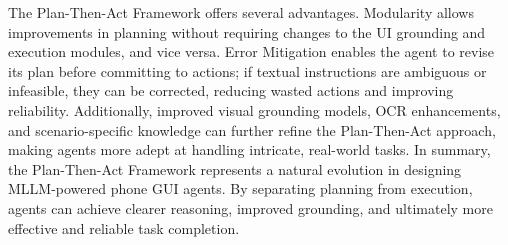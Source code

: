 The Plan-Then-Act Framework offers several advantages. Modularity allows improvements in planning without requiring changes to the UI grounding and execution modules, and vice versa. Error Mitigation enables the agent to revise its plan before committing to actions; if textual instructions are ambiguous or infeasible, they can be corrected, reducing wasted actions and improving reliability. Additionally, improved visual grounding models, OCR enhancements, and scenario-specific knowledge can further refine the Plan-Then-Act approach, making agents more adept at handling intricate, real-world tasks.
In summary, the Plan-Then-Act Framework represents a natural evolution in designing MLLM-powered phone GUI agents. By separating planning from execution, agents can achieve clearer reasoning, improved grounding, and ultimately more effective and reliable task completion.
